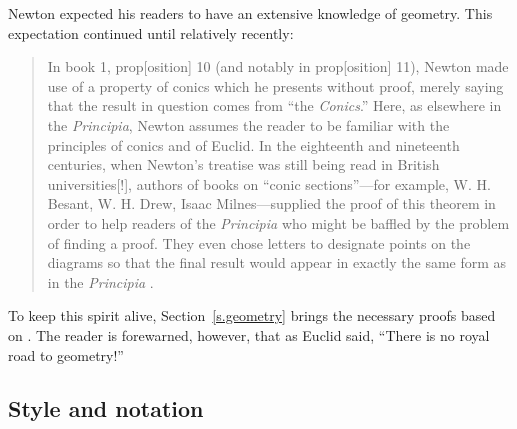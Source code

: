 Newton expected his readers to have an extensive knowledge of geometry. This expectation continued until relatively recently:
\begin{quote}
In book 1, prop[osition] 10 (and notably in prop[osition] 11), Newton made use of a property of conics which he presents without proof, merely saying that the result in question comes from ``the \textit{Conics}.'' Here, as elsewhere in the \textit{Principia}, Newton assumes the reader to be familiar with the principles of conics and of Euclid. In the eighteenth and nineteenth centuries, when Newton's treatise was still being read in British universities[!], authors of books on ``conic sections''---for example, W. H. Besant, W. H. Drew, Isaac Milnes---supplied the proof of this theorem in order to help readers of the \textit{Principia} who might be baffled by the problem of finding a proof. They even chose letters to designate points on the diagrams so that the final result would appear in exactly the same form as in the \textit{Principia} \cite[p.~330]{newton-cohen}.
\end{quote}

To keep this spirit alive, Section~\ref{s.geometry} brings the necessary proofs based on \cite{besant}. The reader is forewarned, however, that as Euclid said, ``There is no royal road to geometry!''



\subsection*{Style and notation}


